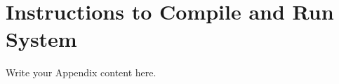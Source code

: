 
\chapter{Instructions to Compile and Run System}
\label{apx:instructions}

Write your Appendix content here.

